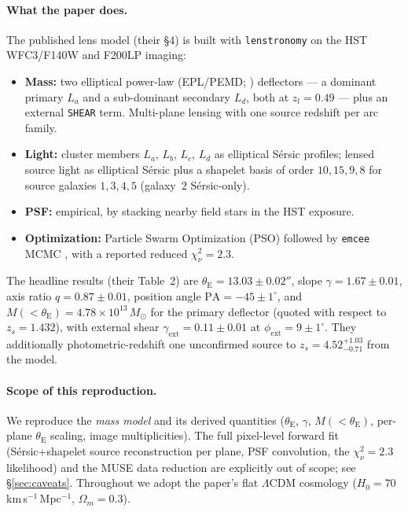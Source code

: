 \documentclass[11pt,letterpaper]{article}
\newcommand{\thetaE}{\ensuremath{\theta_{\mathrm{E}}}}
\newcommand{\gammaslope}{\ensuremath{\gamma}}
\newcommand{\gammaext}{\ensuremath{\gamma_{\mathrm{ext}}}}
\newcommand{\phiext}{\ensuremath{\phi_{\mathrm{ext}}}}
\newcommand{\Msun}{\ensuremath{M_\odot}}
\newcommand{\zs}{\ensuremath{z_s}}
\newcommand{\zl}{\ensuremath{z_l}}
\begin{document}
\paragraph{What the paper does.} The published lens model (their \S4) is built
with \texttt{lenstronomy} \autocite{birrer2018lenstronomy,birrer2021lenstronomy2}
on the HST WFC3/F140W and F200LP imaging:
\begin{itemize}
\item \textbf{Mass:} two elliptical power-law (EPL/PEMD;
      \citealt{tessore2015epl}) deflectors --- a dominant primary $L_a$ and a
      sub-dominant secondary $L_d$, both at $\zl = 0.49$ --- plus an external
      \texttt{SHEAR} term. Multi-plane lensing with one source redshift per arc
      family.
\item \textbf{Light:} cluster members $L_a$, $L_b$, $L_c$, $L_d$ as elliptical
      Sérsic profiles; lensed source light as elliptical Sérsic plus a
      shapelet basis \autocite{refregier2003shapelets,birrer2015basis} of order
      $10, 15, 9, 8$ for source galaxies $1, 3, 4, 5$ (galaxy~$2$ Sérsic-only).
\item \textbf{PSF:} empirical, by stacking nearby field stars in the HST
      exposure.
\item \textbf{Optimization:} Particle Swarm Optimization (PSO) followed by
      \texttt{emcee} MCMC \autocite{foremanmackey2013emcee}, with a reported
      reduced $\chi^2_\nu = 2.3$.
\end{itemize}
The headline results (their Table~2) are
$\thetaE = 13.03 \pm 0.02''$, slope $\gammaslope = 1.67 \pm 0.01$,
axis ratio $q = 0.87 \pm 0.01$, position angle $\mathrm{PA} = -45 \pm 1^\circ$,
and $M(<\thetaE) = 4.78\times10^{13}\,\Msun$ for the primary deflector
(quoted with respect to $\zs = 1.432$), with external shear
$\gammaext = 0.11 \pm 0.01$ at $\phiext = 9 \pm 1^\circ$. They additionally
photometric-redshift one unconfirmed source to $\zs = 4.52^{+1.03}_{-0.71}$
from the model.

\paragraph{Scope of this reproduction.} We reproduce the \emph{mass model} and
its derived quantities ($\thetaE$, $\gammaslope$, $M(<\thetaE)$, per-plane
$\thetaE$ scaling, image multiplicities). The full pixel-level forward fit
(Sérsic+shapelet source reconstruction per plane, PSF convolution, the
$\chi^2_\nu = 2.3$ likelihood) and the MUSE data reduction are explicitly out
of scope; see \S\ref{sec:caveats}. Throughout we adopt the paper's flat
$\Lambda$CDM cosmology ($H_0 = 70\,$km\,s$^{-1}$\,Mpc$^{-1}$,
$\Omega_m = 0.3$).
\end{document}
